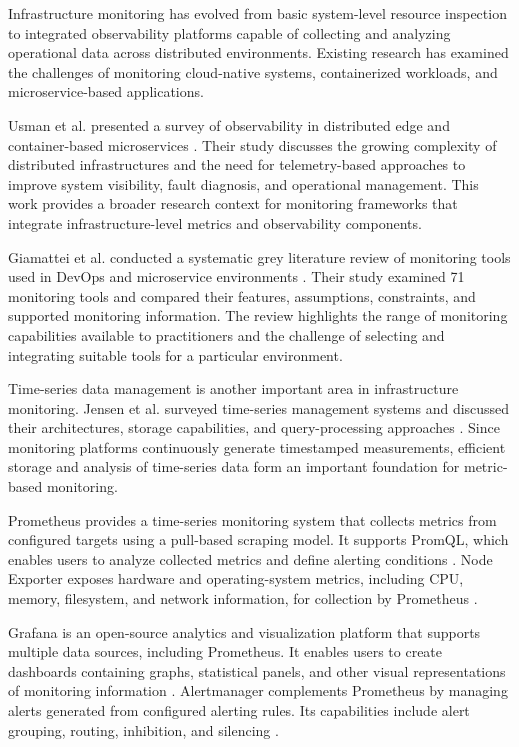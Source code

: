 \documentclass[conference]{IEEEtran}
\begin{document}
Infrastructure monitoring has evolved from basic system-level
resource inspection to integrated observability platforms capable
of collecting and analyzing operational data across distributed
environments. Existing research has examined the challenges of
monitoring cloud-native systems, containerized workloads, and
microservice-based applications.

Usman et al. presented a survey of observability in distributed
edge and container-based microservices \cite{usman2022}. Their
study discusses the growing complexity of distributed
infrastructures and the need for telemetry-based approaches
to improve system visibility, fault diagnosis, and operational
management. This work provides a broader research context for
monitoring frameworks that integrate infrastructure-level
metrics and observability components.

Giamattei et al. conducted a systematic grey literature review
of monitoring tools used in DevOps and microservice environments
\cite{giamattei2024}. Their study examined 71 monitoring tools
and compared their features, assumptions, constraints, and
supported monitoring information. The review highlights the
range of monitoring capabilities available to practitioners
and the challenge of selecting and integrating suitable tools
for a particular environment.

Time-series data management is another important area in
infrastructure monitoring. Jensen et al. surveyed time-series
management systems and discussed their architectures,
storage capabilities, and query-processing approaches
\cite{jensen2017}. Since monitoring platforms continuously
generate timestamped measurements, efficient storage and
analysis of time-series data form an important foundation
for metric-based monitoring.

Prometheus provides a time-series monitoring system that
collects metrics from configured targets using a pull-based
scraping model. It supports PromQL, which enables users to
analyze collected metrics and define alerting conditions
\cite{prometheus}. Node Exporter exposes hardware and
operating-system metrics, including CPU, memory, filesystem,
and network information, for collection by Prometheus
\cite{nodeexporter}.

Grafana is an open-source analytics and visualization platform
that supports multiple data sources, including Prometheus.
It enables users to create dashboards containing graphs,
statistical panels, and other visual representations of
monitoring information \cite{grafana}. Alertmanager complements
Prometheus by managing alerts generated from configured
alerting rules. Its capabilities include alert grouping,
routing, inhibition, and silencing \cite{alertmanager}.
\end{document}
